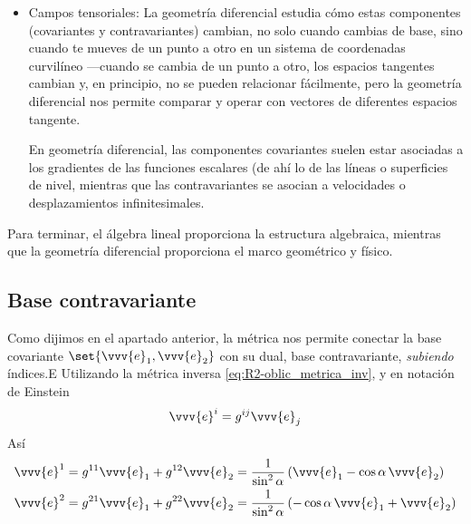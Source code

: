 \begin{itemize}
\begin{itemize}
    En nuestro caso, como $\symbb{R}^2$ es plano, pues no tiene más dimensiones, todo él
    es un mismo espacio vectorial, independientemente del punto de referencia y, por
    tanto, tienen sentido todas las operaciones de suma, resta, comparación, derivada,
    etc., sin necesidad del transporte paralelo y derivada covariante.
  \item Campos tensoriales: La geometría diferencial estudia cómo estas componentes
    (covariantes y contravariantes) cambian, no solo cuando cambias de base, sino cuando
    te mueves de un punto a otro en un sistema de coordenadas curvilíneo ---cuando se
    cambia de un punto a otro, los espacios tangentes cambian y, en principio, no se
    pueden relacionar fácilmente, pero la geometría diferencial nos permite comparar y
    operar con vectores de diferentes espacios tangente.

    En geometría diferencial, las componentes covariantes suelen estar asociadas a los
    gradientes de las funciones escalares (de ahí lo de las líneas o superficies de
    nivel, mientras que las contravariantes se asocian a velocidades o desplazamientos
    infinitesimales.
  \end{itemize}
\end{itemize}

Para terminar, el álgebra lineal proporciona la estructura algebraica, mientras que la geometría diferencial proporciona el marco geométrico y físico.

\subsection{Base contravariante}
Como dijimos en el apartado anterior, la métrica nos permite conectar la base covariante
$\set{\vvv{e}_1,\vvv{e}_2}$ con su dual, base contravariante, \emph{subiendo} índices.E
Utilizando la métrica inversa \eqref{eq:R2-oblic_metrica_inv}, y en notación de Einstein
\begin{equation}
  \vvv{e}^i = g^{ij} \vvv{e}_j
\end{equation}
Así
\begin{align}
  \vvv{e}^1
  &=
    g^{11}\vvv{e}_1 + g^{12}\vvv{e}_2
    = \dfrac{1}{\sin^2\alpha}
    \left(%
    \vvv{e}_1 - \cos\alpha\,\vvv{e}_2
    \right)\\
  \vvv{e}^2
  &=
    g^{21}\vvv{e}_1 + g^{22}\vvv{e}_2
    = \dfrac{1}{\sin^2\alpha}
    \left(%
    -\cos\alpha\,\vvv{e}_1 + \vvv{e}_2
    \right)
\end{align}

